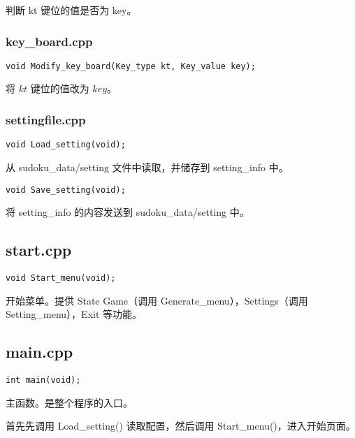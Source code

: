\documentclass{article}
\begin{document}
    判断 kt 键位的值是否为 key。

    \subsubsection{key\_board.cpp}

    \begin{lstlisting}
void Modify_key_board(Key_type kt, Key_value key);
    \end{lstlisting}
    
    将 $kt$ 键位的值改为 $key$。
    
    \subsubsection{settingfile.cpp}

    \begin{lstlisting}
void Load_setting(void);
    \end{lstlisting}

    从 sudoku\_data/setting 文件中读取，并储存到 setting\_info 中。

    \begin{lstlisting}
void Save_setting(void);
    \end{lstlisting}

    将 setting\_info 的内容发送到 sudoku\_data/setting 中。
    \subsection{start.cpp}

    \begin{lstlisting}
void Start_menu(void);
    \end{lstlisting}

    开始菜单。提供 State Game（调用 Generate\_menu），Settings（调用 Setting\_menu），Exit 等功能。

    \subsection{main.cpp}

    \begin{lstlisting}
int main(void);
    \end{lstlisting}

    主函数。是整个程序的入口。
    
    首先先调用 Load\_setting() 读取配置，然后调用 Start\_menu()，进入开始页面。
\end{document}
